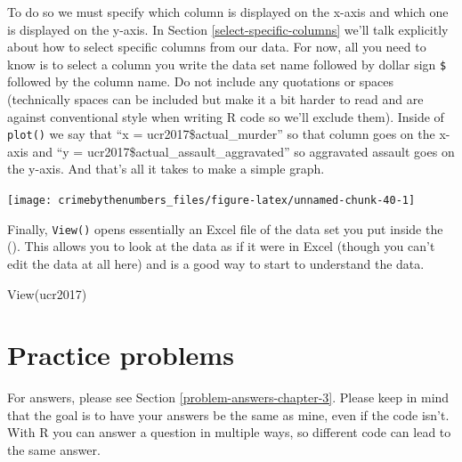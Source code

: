 \documentclass[
]{krantz}
\makeatletter
\newenvironment{Shaded}{\begin{snugshade}}{\end{snugshade}}
\newcommand{\AttributeTok}[1]{\textcolor[rgb]{0.61,0.61,0.61}{#1}}
\newcommand{\FunctionTok}[1]{\textcolor[rgb]{0,0,0}{#1}}
\newcommand{\NormalTok}[1]{#1}
\newcommand{\SpecialCharTok}[1]{\textcolor[rgb]{0,0,0}{#1}}
\newenvironment{kframe}{%
\medskip{}
\setlength{\fboxsep}{.8em}
 \def\at@end@of@kframe{}%
 \ifinner\ifhmode%
  \def\at@end@of@kframe{\end{minipage}}%
  \begin{minipage}{\columnwidth}%
 \fi\fi%
 \def\FrameCommand##1{\hskip\@totalleftmargin \hskip-\fboxsep
 \colorbox{shadecolor}{##1}\hskip-\fboxsep
     \hskip-\linewidth \hskip-\@totalleftmargin \hskip\columnwidth}%
 \MakeFramed {\advance\hsize-\width
   \@totalleftmargin\z@ \linewidth\hsize
   \@setminipage}}%
 {\par\unskip\endMakeFramed%
 \at@end@of@kframe}
\renewenvironment{Shaded}{\begin{kframe}}{\end{kframe}}
\makeatother
\begin{document}
To do so we must specify which column is displayed on the x-axis and which one is displayed on the y-axis. In Section \ref{select-specific-columns} we'll talk explicitly about how to select specific columns from our data. For now, all you need to know is to select a column you write the data set name followed by dollar sign \texttt{\$} followed by the column name. Do not include any quotations or spaces (technically spaces can be included but make it a bit harder to read and are against conventional style when writing R code so we'll exclude them). Inside of \texttt{plot()} we say that ``x = ucr2017\$actual\_murder'' so that column goes on the x-axis and ``y = ucr2017\$actual\_assault\_aggravated'' so aggravated assault goes on the y-axis. And that's all it takes to make a simple graph.

\begin{Shaded}
\end{Shaded}

\begin{center}\texttt{[image: crimebythenumbers\_files/figure-latex/unnamed-chunk-40-1]} \end{center}

Finally, \texttt{View()} opens essentially an Excel file of the data set you put inside the (). This allows you to look at the data as if it were in Excel (though you can't edit the data at all here) and is a good way to start to understand the data.

\begin{Shaded}
\begin{Highlighting}[]
\FunctionTok{View}\NormalTok{(ucr2017)}
\end{Highlighting}
\end{Shaded}

\hypertarget{practice-problems-1}{%
\section{Practice problems}\label{practice-problems-1}}

For answers, please see Section \ref{problem-answers-chapter-3}. Please keep in mind that the goal is to have your answers be the same as mine, even if the code isn't. With R you can answer a question in multiple ways, so different code can lead to the same answer.
\end{document}
